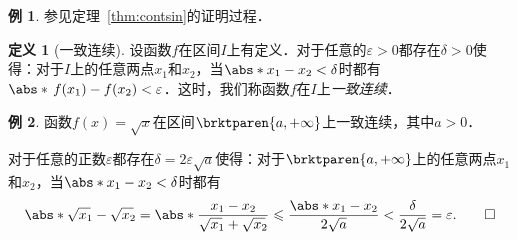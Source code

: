 \documentclass[a4paper,punct=CCT]{ctexbook}
\makeatletter
\theoremstyle{definition}
\newtheorem{definition}{定义}
\newtheorem*{example*}{例}
\theoremstyle{remark}
\renewcommand*{\proofname}{证}
\renewenvironment{proof}[1][\proofname]{\par
  \pushQED{\qed}%
  \normalfont \topsep6\p@\@plus6\p@\relax
  \trivlist
  \item[\hskip\labelsep
    \bfseries
    #1%
    ]\ignorespaces
}{%
  \popQED\endtrivlist\@endpefalse
}
\let\leq\leqslant
\let\le\leq
\makeatother
\begin{document}
\begin{example*}
  参见定理~\ref{thm:contsin}的证明过程．
\end{example*}

\begin{definition}[一致连续]
  \label{defn:unicont}
  设函数\(f\)在区间\(I\)上有定义．对于任意的\(\varepsilon > 0\)都存在\(\delta > 0\)使得：对于\(I\)上的任意两点\(x_1\)和\(x_2\)，当\(\abs*{x_1 - x_2} < \delta\)时都有\(\abs*{\,f(x_1) - f(x_2)} < \varepsilon\)．这时，我们称函数\(f\)在\(I\)上\emph{一致连续}．
\end{definition}

\begin{example*}
  函数\(f(x) = \sqrt x\)在区间\(\brktparen{a,+\infty}\)上一致连续，其中\(a > 0\)．

  \begin{proof}
    对于任意的正数\(\varepsilon\)都存在\(\delta = 2 \varepsilon \sqrt a\)使得：对于\(\brktparen{a,+\infty}\)上的任意两点\(x_1\)和\(x_2\)，当\(\abs*{x_1 - x_2} < \delta\)时都有
    \begin{equation*}
      \abs*{\sqrt{\smash[b]{x_1}\!}\, - \sqrt{\smash[b]{x_2}\!}\,}
      = \abs*{\frac{x_1 - x_2}{\sqrt{\smash[b]{x_1}\!}\, + \sqrt{\smash[b]{x_2}\!}\,}}
      \le \frac{\abs*{x_1 - x_2}}{2 \sqrt a}
      < \frac{\delta}{2 \sqrt a}
      = \varepsilon.
      \qedhere
    \end{equation*}
  \end{proof}
\end{example*}
\end{document}
